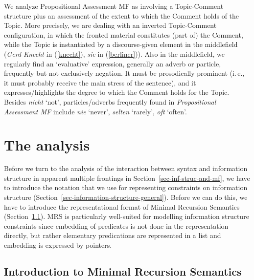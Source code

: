 \begin{exe}
\begin{xlist}[iv.]
\begin{exe}
\begin{xlist}[iv.]
\begin{exe}
\begin{xlist}[iv.]
We analyze Propositional Assessment MF as involving a Topic-Comment structure plus an assessment of the extent to which the Comment holds of the Topic. More precisely, we are dealing with an inverted Topic-Comment configuration, in which the fronted material constitutes (part of) the Comment, while the Topic is instantiated by a discourse-given element in the middlefield (\emph{Gerd Knecht} in (\ref{knecht}), \emph{sie} in (\ref{berliner})). Also in the middlefield, we regularly find an `evaluative' expression, generally an adverb or particle, frequently but not exclusively negation. It must be prosodically prominent (i.\,e., it must probably receive the main stress of the sentence), and it expresses/highlights the degree to which the Comment holds for the Topic. Besides \textit{nicht} `not', particles/adverbs frequently found in \textit{Propositional Assessment MF} include \textit{nie} `never', \textit{selten} `rarely', \textit{oft} `often'. 


\section{The analysis}\label{analysis}

Before we turn to the analysis of the interaction between syntax and information structure in apparent multiple frontings in Section~\ref{sec-inf-struc-and-mf}, we have to introduce the notation that we use for representing constraints on information structure (Section~\ref{sec-information-structure-general}). Before we can do this, we have to introduce the representational format of Minimal Recursion Semantics (Section~\ref{sec-intro-MRS}). MRS is particularly well-suited for
modelling information structure constraints since embedding of predicates is not done in the representation directly, but rather elementary predications are represented in a list and embedding is expressed by pointers.

\subsection{Introduction to Minimal Recursion Semantics}
\label{sec-intro-MRS}


\end{xlist}
\end{exe}
\end{xlist}
\end{exe}
\end{xlist}
\end{exe}

